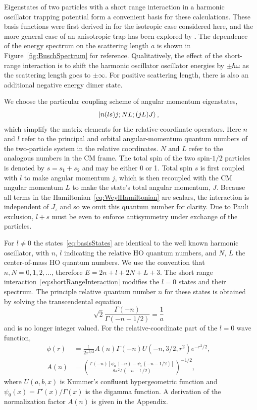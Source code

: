 \documentclass[%
 onecolumn,
 notitlepage,
 amsmath,amssymb,
 aps,
]{revtex4-1}
\begin{document}
Eigenstates of two particles with a short range interaction in a harmonic oscillator trapping potential form a convenient basis for these calculations. These basis functions were first derived in \cite{Busch} for the isotropic case considered here, and the more general case of an anisotropic trap has been explored by \cite{PhysRevA.74.022712}. The dependence of the energy spectrum on the scattering length $a$ is shown in Figure~\ref{fig:BuschSpectrum} for reference. Qualitatively, the effect of the short-range interaction is to shift the harmonic oscillator oscillator energies by $\pm \hbar\omega$ as the scattering length goes to $\pm \infty$. For positive scattering length, there is also an additional negative energy dimer state.

We choose the particular coupling scheme of angular momentum eigenstates,
\begin{equation}\label{eq:basisStates}
\ket{n(ls)j;NL;(jL)J},
\end{equation}
which simplify the matrix elements for the relative-coordinate operators. Here $n$ and $l$ refer to the principal and orbital angular-momentum quantum numbers of the two-particle system in the relative coordinates. $N$ and $L$ refer to the analogous numbers in the CM frame. The total spin of the two spin-$1/2$ particles is denoted by $s = s_1 + s_2$ and may be either 0 or 1. Total spin $s$ is first coupled with $l$ to make angular momentum $j$, which is then recoupled with the CM angular momentum $L$ to make the state's total angular momentum, $J$. Because all terms in the Hamiltonian~\eqref{eq:WeylHamiltonian} are scalars, the interaction is independent of $J_z$ and so we omit this quantum number for clarity. Due to Pauli exclusion, $l + s$ must be even to enforce antisymmetry under exchange of the particles.

For $l\neq0$ the states~\eqref{eq:basisStates} are identical to the well known harmonic oscillator, with $n$, $l$ indicating the relative HO quantum numbers, and $N$, $L$ the center-of-mass HO quantum numbers. We use the convention that $n,N=0,1,2,\dots$, therefore $E=2n+l+2N+L+3$. The short range interaction~\eqref{eq:shortRangeInteraction} modifies the $l=0$ states and their spectrum. The principle relative quantum number $n$ for these states is obtained by solving the transcendental equation
\begin{equation}\label{eq:eigenvalueEqn}
\sqrt{2}\frac{\Gamma(-n)}{\Gamma(-n-1/2)}=\frac{1}{a}
\end{equation}
and is no longer integer valued. For the relative-coordinate part of the $l=0$ wave function,
\begin{align}
\phi(r)&=\frac{1}{2\pi^{3/2}}A(n)\Gamma(-n)U(-n,3/2,r^2)e^{-r^2/2}, \label{eq:BuschWF}\\
A(n)&=\left(\frac{\Gamma(-n)[\psi_0(-n)-\psi_0(-n-1/2)]}{8 \pi^2 \Gamma(-n-1/2)}\right)^{-1/2},
\end{align}
where $U(a,b,x)$ is Kummer's confluent hypergeometric function and $\psi_0(x)=\Gamma'(x)/\Gamma(x)$ is the digamma function. A derivation of the normalization factor $A(n)$ is given in the Appendix.
\end{document}
